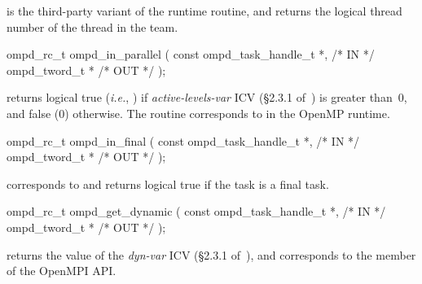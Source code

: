\descr
{} is the third-party variant of the 
 runtime routine, and returns the logical
thread number of the thread in the team.


\argdesc

\crossreferences


\summary

\format
\ccppspecificstart
\begin{boxedcode}
ompd\_rc\_t ompd\_in\_parallel (
  const ompd\_task\_handle\_t  *,                           /* IN */
  ompd\_tword\_t              *                                   /* OUT */
); 
\end{boxedcode}
\ccppspecificend

\descr
{} returns logical true (\textit{i.e.}, )
if \emph{active-levels-var}
ICV (\S2.3.1 of~\cite{OpenMP}) is greater than~0, and false (0) otherwise.
The routine corresponds to  in the OpenMP runtime.

\argdesc

\crossreferences


\summary

\format
\ccppspecificstart
\begin{boxedcode}
ompd\_rc\_t ompd\_in\_final (
  const ompd\_task\_handle\_t  *,                           /* IN */
  ompd\_tword\_t              *                                   /* OUT */
); 
\end{boxedcode}
\ccppspecificend

\descr
{} corresponds to  and returns
logical true if the task is a final task.

\argdesc

\crossreferences


\summary

\format
\ccppspecificstart
\begin{boxedcode}
ompd\_rc\_t ompd\_get\_dynamic (
  const ompd\_task\_handle\_t  *,                           /* IN */
  ompd\_tword\_t              *                                   /* OUT */
);
\end{boxedcode}
\ccppspecificend

\descr
{} returns the value of the
\emph{dyn-var} ICV (\S2.3.1 of~\cite{OpenMP}),
and corresponds to the  member of the OpenMPI API.

